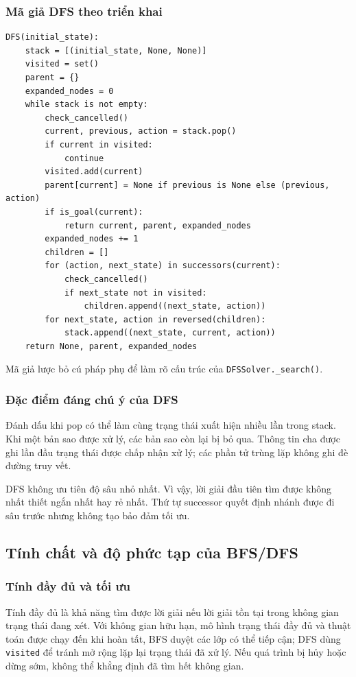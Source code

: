 \subsubsection{Mã giả DFS theo triển khai}
\begin{lstlisting}
DFS(initial_state):
    stack = [(initial_state, None, None)]
    visited = set()
    parent = {}
    expanded_nodes = 0
    while stack is not empty:
        check_cancelled()
        current, previous, action = stack.pop()
        if current in visited:
            continue
        visited.add(current)
        parent[current] = None if previous is None else (previous, action)
        if is_goal(current):
            return current, parent, expanded_nodes
        expanded_nodes += 1
        children = []
        for (action, next_state) in successors(current):
            check_cancelled()
            if next_state not in visited:
                children.append((next_state, action))
        for next_state, action in reversed(children):
            stack.append((next_state, current, action))
    return None, parent, expanded_nodes
\end{lstlisting}
Mã giả lược bỏ cú pháp phụ để làm rõ cấu trúc của \texttt{DFSSolver.\_search()}.

\subsubsection{Đặc điểm đáng chú ý của DFS}
Đánh dấu khi pop có thể làm cùng trạng thái xuất hiện nhiều lần trong stack. Khi một bản sao được xử lý, các bản sao còn lại bị bỏ qua. Thông tin cha được ghi lần đầu trạng thái được chấp nhận xử lý; các phần tử trùng lặp không ghi đè đường truy vết.

DFS không ưu tiên độ sâu nhỏ nhất. Vì vậy, lời giải đầu tiên tìm được không nhất thiết ngắn nhất hay rẻ nhất. Thứ tự successor quyết định nhánh được đi sâu trước nhưng không tạo bảo đảm tối ưu.

\subsection{Tính chất và độ phức tạp của BFS/DFS}
\label{subsec:bfs_dfs_props}

\subsubsection{Tính đầy đủ và tối ưu}
Tính đầy đủ là khả năng tìm được lời giải nếu lời giải tồn tại trong không gian trạng thái đang xét. Với không gian hữu hạn, mô hình trạng thái đầy đủ và thuật toán được chạy đến khi hoàn tất, BFS duyệt các lớp có thể tiếp cận; DFS dùng \texttt{visited} để tránh mở rộng lặp lại trạng thái đã xử lý. Nếu quá trình bị hủy hoặc dừng sớm, không thể khẳng định đã tìm hết không gian.

